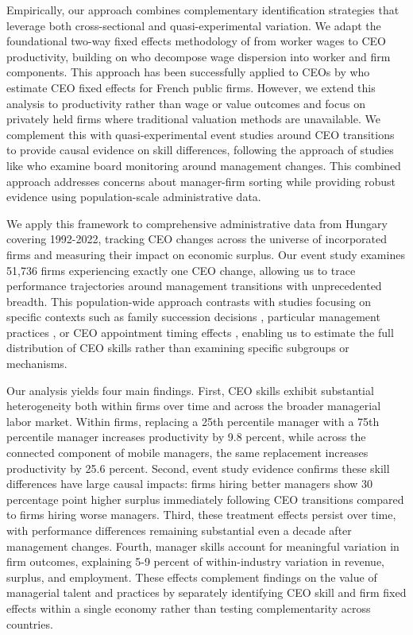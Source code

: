 \documentclass[11pt,a4paper]{article}
\begin{document}
Empirically, our approach combines complementary identification strategies that leverage both cross-sectional and quasi-experimental variation. We adapt the foundational two-way fixed effects methodology of \citet{abowd1999high} from worker wages to CEO productivity, building on \citet{card2018firms} who decompose wage dispersion into worker and firm components. This approach has been successfully applied to CEOs by \citet{kramarz2013thesmar} who estimate CEO fixed effects for French public firms. However, we extend this analysis to productivity rather than wage or value outcomes and focus on privately held firms where traditional valuation methods are unavailable. We complement this with quasi-experimental event studies around CEO transitions to provide causal evidence on skill differences, following the approach of studies like \citet{cornelli2013monitoring} who examine board monitoring around management changes. This combined approach addresses concerns about manager-firm sorting while providing robust evidence using population-scale administrative data.

We apply this framework to comprehensive administrative data from Hungary covering 1992-2022, tracking CEO changes across the universe of incorporated firms and measuring their impact on economic surplus. Our event study examines 51,736 firms experiencing exactly one CEO change, allowing us to trace performance trajectories around management transitions with unprecedented breadth. This population-wide approach contrasts with studies focusing on specific contexts such as family succession decisions \citep{bennedsen2007inside}, particular management practices \citep{feng2025role}, or CEO appointment timing effects \citep{li2024ceo}, enabling us to estimate the full distribution of CEO skills rather than examining specific subgroups or mechanisms.

Our analysis yields four main findings. First, CEO skills exhibit substantial heterogeneity both within firms over time and across the broader managerial labor market. Within firms, replacing a 25th percentile manager with a 75th percentile manager increases productivity by 9.8 percent, while across the connected component of mobile managers, the same replacement increases productivity by 25.6 percent. Second, event study evidence confirms these skill differences have large causal impacts: firms hiring better managers show 30 percentage point higher surplus immediately following CEO transitions compared to firms hiring worse managers. Third, these treatment effects persist over time, with performance differences remaining substantial even a decade after management changes. Fourth, manager skills account for meaningful variation in firm outcomes, explaining 5-9 percent of within-industry variation in revenue, surplus, and employment. These effects complement findings on the value of managerial talent and practices \citep{dejong2022managerial} by separately identifying CEO skill and firm fixed effects within a single economy rather than testing complementarity across countries.
\end{document}
